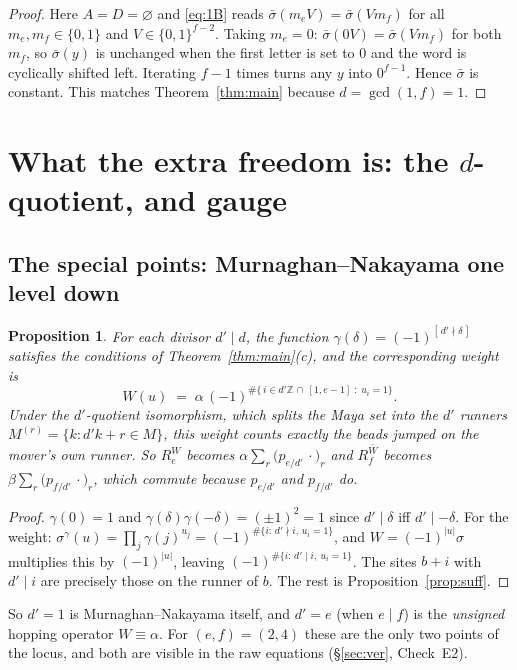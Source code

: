 \documentclass[11pt]{article}
\newtheorem{proposition}[theorem]{Proposition}
\theoremstyle{definition}
\theoremstyle{remark}
\newcommand{\Z}{\mathbb{Z}}
\newcommand{\Mult}[1]{#1\,\cdot}
\begin{document}
\begin{proof}
Here $A=D=\varnothing$ and \eqref{eq:1B} reads $\bar\sigma(m_eV)=\bar\sigma(Vm_f)$ for all
$m_e,m_f\in\{0,1\}$ and $V\in\{0,1\}^{f-2}$.  Taking $m_e=0$: $\bar\sigma(0V)=\bar\sigma(Vm_f)$
for both $m_f$, so $\bar\sigma(y)$ is unchanged when the first letter is set to $0$ and the
word is cyclically shifted left.  Iterating $f-1$ times turns any $y$ into $0^{f-1}$.
Hence $\bar\sigma$ is constant.  This matches Theorem~\ref{thm:main} because
$d=\gcd(1,f)=1$.
\end{proof}

\section{What the extra freedom is: the $d$-quotient, and gauge}\label{sec:gauge}

\subsection{The special points: Murnaghan--Nakayama one level down}

\begin{proposition}\label{prop:quotient}
For each divisor $d'\mid d$, the function $\gamma(\delta)=(-1)^{[\,d'\nmid\delta\,]}$
satisfies the conditions of Theorem~\ref{thm:main}(c), and the corresponding weight is
\[
   W(u)\;=\;\alpha\,(-1)^{\#\{\,i\in d'\Z\,\cap\,[1,e-1]\;:\;u_i=1\}} .
\]
Under the $d'$-quotient isomorphism, which splits the Maya set into the $d'$ runners
$M^{(r)}=\{k: d'k+r\in M\}$, this weight counts exactly the beads jumped \emph{on the
mover's own runner}.  So $R_e^{W}$ becomes $\alpha\sum_{r}\bigl(\Mult{p_{e/d'}}\bigr)_r$
and $R_f^{\bar W}$ becomes $\beta\sum_r\bigl(\Mult{p_{f/d'}}\bigr)_r$, which commute
because $p_{e/d'}$ and $p_{f/d'}$ do.
\end{proposition}

\begin{proof}
$\gamma(0)=1$ and $\gamma(\delta)\gamma(-\delta)=(\pm1)^2=1$ since $d'\mid\delta$ iff
$d'\mid-\delta$.  For the weight: $\sigma^\gamma(u)=\prod_j\gamma(j)^{u_j}
=(-1)^{\#\{i:\,d'\nmid i,\,u_i=1\}}$, and $W=(-1)^{|u|}\sigma$ multiplies this by
$(-1)^{|u|}$, leaving $(-1)^{\#\{i:\,d'\mid i,\ u_i=1\}}$.  The sites $b+i$ with
$d'\mid i$ are precisely those on the runner of $b$.  The rest is
Proposition~\ref{prop:suff}.
\end{proof}

So $d'=1$ is Murnaghan--Nakayama itself, and $d'=e$ (when $e\mid f$) is the
\emph{unsigned} hopping operator $W\equiv\alpha$.  For $(e,f)=(2,4)$ these are the only
two points of the locus, and both are visible in the raw equations
(\S\ref{sec:ver}, Check~E2).
\end{document}
